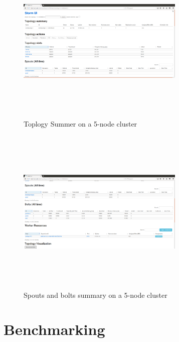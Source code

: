 \documentclass[9pt,twocolumn,twoside]{../../styles/osajnl}
\begin{document}
\begin{figure}[!htb]
  \includegraphics[width=8cm,height=8cm,keepaspectratio,width=\linewidth]{images/bench-4.png}
  \caption{Toplogy Summer on a 5-node cluster }
  \label{Topology summary on a 5-node cluster}
\end{figure}

\begin{figure}[!htb]
  \centering
  \includegraphics[width=8cm,height=8cm,keepaspectratio,width=\linewidth]{images/bench-5.png}
  \caption{Spouts and bolts summary on a 5-node cluster }
  \label{Spouts and bolts summary on a 5-node cluster}
\end{figure}



\section{Benchmarking}
\end{document}
